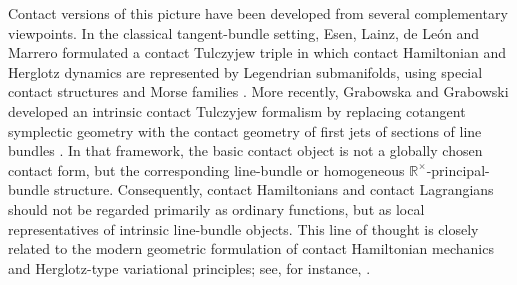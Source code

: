 \documentclass[11pt]{article}
\newcommand{\Rtimes}{\mathbb{R}^{\times}}
\begin{document}
Contact versions of this picture have been developed from several complementary
viewpoints. In the classical tangent-bundle setting, Esen, Lainz,
de León and Marrero formulated a contact Tulczyjew triple in which contact
Hamiltonian and Herglotz dynamics are represented by Legendrian submanifolds,
using special contact structures and Morse families \cite{EsenLainzDeLeonMarrero2021}.
More recently, Grabowska and Grabowski developed an intrinsic contact Tulczyjew
formalism by replacing cotangent symplectic geometry with the contact geometry of
first jets of sections of line bundles \cite{GG2024}. In that framework, the basic
contact object is not a globally chosen contact form, but the corresponding
line-bundle or homogeneous \(\Rtimes\)-principal-bundle structure. Consequently,
contact Hamiltonians and contact Lagrangians should not be regarded primarily as
ordinary functions, but as local representatives of intrinsic line-bundle objects.
This line of thought is closely related to the modern geometric formulation of
contact Hamiltonian mechanics and Herglotz-type variational principles; see, for
instance, \cite{BravettiCruzTapias2017,deLeonLainz2019}.
\end{document}
